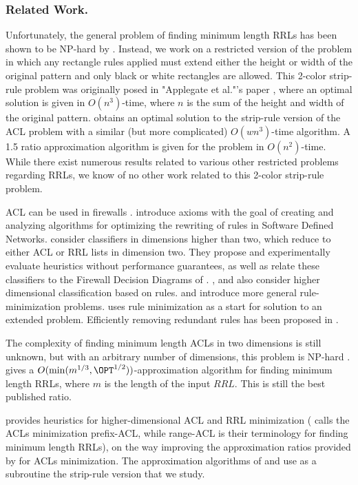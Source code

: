\subsubsection{Related Work.}
Unfortunately, the general problem of finding minimum length RRLs has been shown to be NP-hard by \cite{ACJKLW07}.
Instead, we work on a restricted version of the problem in which any rectangle rules applied must extend either the height or width of the original pattern and only black or white rectangles are allowed.
This 2-color strip-rule problem was originally posed in "Applegate et al."'s paper
\cite{ACJKLW07}, where an optimal solution is given in $O(n^3)$-time, where $n$ is the sum of the height and width of the original pattern.
\cite{ACJKLW07} obtains an optimal solution to the strip-rule version of the
ACL problem with a similar (but more complicated) $O(w n^3)$-time algorithm.
A 1.5 ratio approximation algorithm is given for the problem in $O(n^2)$-time.
While there exist numerous results related to various other restricted problems regarding RRLs, we know of no other work related to this 2-color strip-rule problem.

ACL can be used in firewalls \cite{KRRW12}.
\cite{KRRW12b} introduce axioms with the goal of
creating and analyzing algorithms for optimizing the rewriting of rules
in Software Defined Networks.
\cite{LMT10} consider classifiers in dimensions higher than two,
which reduce to either ACL or RRL lists in dimension two. They propose
and experimentally evaluate heuristics without performance guarantees,
as well as relate these classifiers to the Firewall Decision Diagrams of
\cite{GL07}.
\cite{PL14}, and \cite{CDG16}  also consider higher dimensional classification based on rules.
\cite{KLRW13} and \cite{ZNHBM14} introduce more general rule-minimization problems.
\cite{SK10} uses rule minimization as a start for solution to an
extended problem. Efficiently
removing redundant rules has been proposed in \cite{SK10b}.

The complexity of finding minimum length ACLs in two dimensions
is still unknown, but with an arbitrary
number of dimensions, this problem is NP-hard \cite{KNCER13}.
\cite{ACJKLW07} gives a $O(\min(m^{1/3},\OPT^{1/2}))$-approximation
algorithm for finding minimum length RRLs, where $m$ is the length
of the input $RRL$. This is still the best published ratio.

\cite{DLT16} provides heuristics for higher-dimensional ACL and RRL
minimization
(\cite{DLT16} calls the ACLs minimization prefix-ACL, while
range-ACL is their terminology for finding minimum length RRLs),
on the way improving the approximation ratios provided by
 \cite{ACJKLW07} for ACLs minimization.  The approximation
algorithms of \cite{DLT16}  and \cite{ACJKLW07} use
as a subroutine the strip-rule version that we study.


